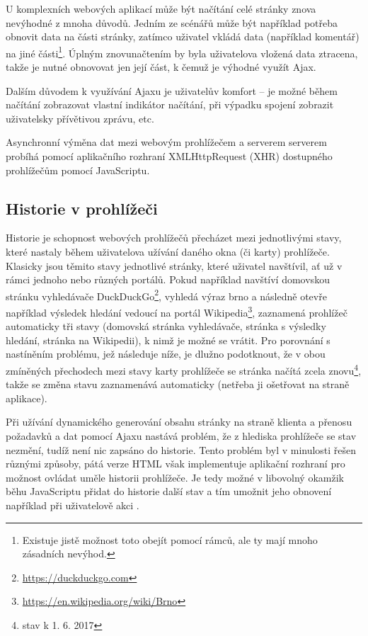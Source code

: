 \documentclass[a4paper, 11pt, oneside]{book}
\newcommand\ex{\textsf}
\begin{document}
					U komplexních webových aplikací může být načítání celé stránky znova nevýhodné z mnoha důvodů. Jedním ze scénářů může být například potřeba obnovit data na části stránky, zatímco uživatel vkládá data (například komentář) na jiné části\footnote{Existuje jistě možnost toto obejít pomocí rámců, ale ty mají mnoho zásadních nevýhod.}. Úplným znovunačtením by byla uživatelova vložená data ztracena, takže je nutné obnovovat jen její část, k čemuž je výhodné využít Ajax.

					Dalším důvodem k využívání Ajaxu je uživatelův komfort -- je možné během načítání zobrazovat vlastní indikátor načítání, při výpadku spojení zobrazit uživatelsky přívětivou zprávu, etc.

					Asynchronní výměna dat mezi webovým prohlížečem a serverem serverem probíhá pomocí aplikačního rozhraní XMLHttpRequest (XHR) dostupného prohlížečům pomocí JavaScriptu. \parencite{mozilla2017XMLHTTP}

				\subsection{Historie v prohlížeči}

					Historie je schopnost webových prohlížečů přecházet mezi jednotlivými stavy, které nastaly během uživatelova užívání daného okna (či karty) prohlížeče. Klasicky jsou těmito stavy jednotlivé stránky, které uživatel navštívil, ať už v rámci jednoho nebo různých portálů. Pokud například navštíví domovskou stránku vyhledávače DuckDuckGo\footnote{\url{https://duckduckgo.com}}, vyhledá výraz \ex{brno} a následně otevře například výsledek hledání vedoucí na portál Wikipedia\footnote{\url{https://en.wikipedia.org/wiki/Brno}}, zaznamená prohlížeč automaticky tři stavy (domovská stránka vyhledávače, stránka s výsledky hledání, stránka na Wikipedii), k nimž je možné se vrátit. Pro porovnání s nastíněním problému, jež následuje níže, je dlužno podotknout, že v obou zmíněných přechodech mezi stavy karty prohlížeče se stránka načítá zcela znovu\footnote{stav k 1. 6. 2017}, takže se změna stavu zaznamenává automaticky (netřeba ji ošetřovat na straně aplikace).

					Při užívání dynamického generování obsahu stránky na straně klienta a přenosu požadavků a dat pomocí Ajaxu nastává problém, že z hlediska prohlížeče se stav nezmění, tudíž není nic zapsáno do historie. Tento problém byl v minulosti řešen různými způsoby, pátá verze HTML však implementuje aplikační rozhraní pro možnost ovládat uměle historii prohlížeče. Je tedy možné v libovolný okamžik běhu JavaScriptu přidat do historie další stav a tím umožnit jeho obnovení například při uživatelově akci .
\end{document}
